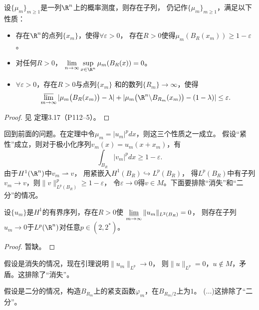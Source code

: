 \begin{theorem}
    设$\{\mu_m\}_{m\ge1}$是一列$\R^n$上的概率测度，则存在子列，
    仍记作$\{\mu_m\}_{m\ge1}$，满足以下性质：
    \begin{itemize}
        \item[紧性] 存在$\R^n$的点列$\{x_m\}$，使得$\forall\varepsilon>0$，
        存在$R>0$使得$\mu_m(B_R(x_m))\ge1-\varepsilon$。
        \item[消失] 对任何$R>0$，
        $\lim\limits_{n\to\infty}\sup\limits_{x\in\R^n}\mu_m(B_R(x))=0$。
        \item[二分] $\forall\varepsilon>0$，存在$R>0$与点列$\{x_m\}$
        和的数列$\{R_m\}\to\infty$，使得
        \[\varlimsup_{m\to\infty}|\mu_m\big(B_R(x_m)\big)-\lambda|
        +|\mu_m\big(\R^n\backslash B_{R_m}(x_m)\big)-(1-\lambda)|\le\varepsilon.\]
    \end{itemize}
\end{theorem}
\begin{proof}
    见\cite{Liu} 定理3.17（P112--5）。
\end{proof}
回到前面的问题。在定理中令$\mu_m=|u_m|^pdx$，则这三个性质之一成立。
假设“紧性”成立，则对于极小化序列$v_m(x)=u_m(x+x_m)$，有
\[\int_{B_R}|v_m|^pdx\ge1-\varepsilon.\]
由于$H^1(\R^n)$中$v_m\rightharpoonup v$，
用紧嵌入$H^1(B_R)\hookrightarrow L^p(B_R)$，
得$L^p(B_R)$中有子列$v_m\to v$，则$\|v\|_{L^p(B_R)}^p\ge1-\varepsilon$，
令$\varepsilon\to0$得$v\in M$。下面要排除“消失”和“二分”的情况。
\begin{lemma}[Lions]
    设$\{u_m\}$是$H^1$的有界序列，存在$R>0$使
    $\varliminf\limits_{m\to\infty}\|u_m\|_{L^2(B_R)}=0$，
    则存在子列$u_m\to0$于$L^p(\R^n)$对任意$p\in(2,2^*)$。
\end{lemma}
\begin{proof}
    暂缺。
\end{proof}
假设是消失的情况，现在引理说明$\|u_m\|_{L^p}\to0$，
则$\|u\|_{L^p}=0$，$u\notin M$，矛盾。这排除了“消失”。

假设是二分的情况，构造$B_{R_m}$上的紧支函数$\varphi_m$，在$B_{R_m/2}$上为$1$。
(...)这排除了“二分”。